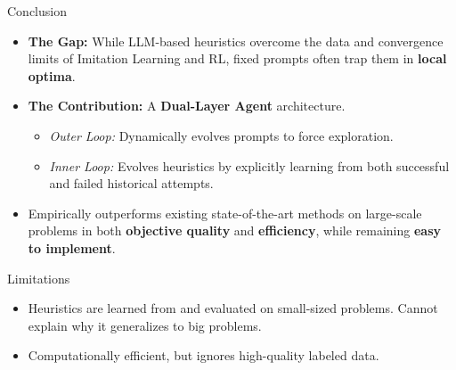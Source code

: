 \documentclass{beamer}
\begin{document}
\begin{frame}{Conclusion}
	\begin{itemize}
		\item \textbf{The Gap:} While LLM-based heuristics overcome the data and convergence limits of Imitation Learning and RL, fixed prompts often trap them in \textbf{local optima}.
		
		\vspace{0.2cm}
		
		\item \textbf{The Contribution:} A \textbf{Dual-Layer Agent} architecture.
		\begin{itemize}
			\item \textit{Outer Loop:} Dynamically evolves prompts to force exploration.
			\item \textit{Inner Loop:} Evolves heuristics by explicitly learning from both successful and failed historical attempts.
		\end{itemize}
		
		\vspace{0.2cm}
		
		\item   Empirically outperforms existing state-of-the-art methods on large-scale problems in both \textbf{objective quality} and \textbf{efficiency}, while remaining \textbf{easy to implement}.
		
	\end{itemize}
\end{frame}
\begin{frame}{Limitations}
	\begin{itemize}
		\item Heuristics are learned from and evaluated on small-sized problems. Cannot explain why it generalizes to big problems.
		\item Computationally efficient, but ignores high-quality labeled data.
	\end{itemize}
\end{frame}
	
\end{document}
